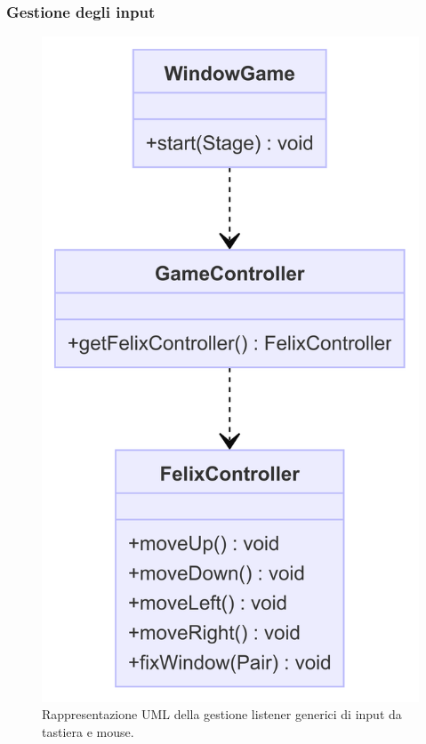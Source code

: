 \documentclass[a4paper,12pt]{report}
\begin{document}
\subsubsection{Gestione degli input }

\begin{figure}[H]
\centering{}
\includegraphics[width=\textwidth]{img/input.png}
\caption{Rappresentazione UML della gestione listener generici di input da tastiera e mouse.}
\end{figure}
\end{document}
